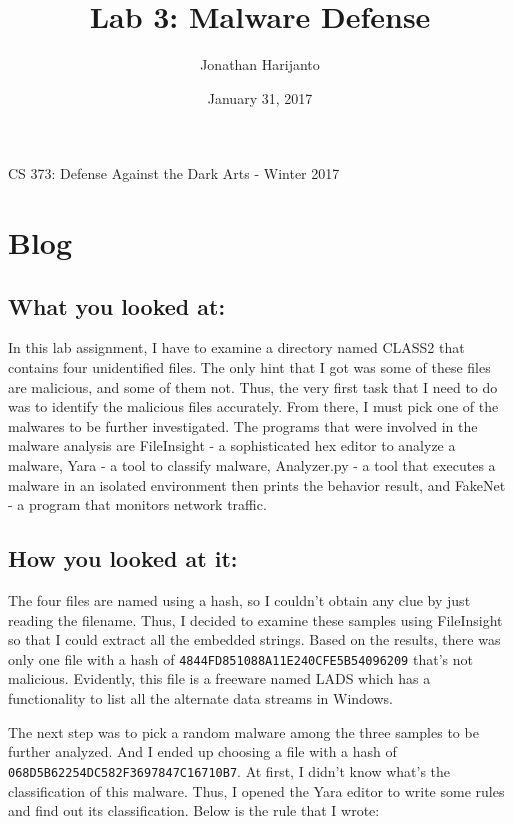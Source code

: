 \documentclass[letterpaper,10pt,titlepage,draftclsnofoot,onecolumn]{IEEEtran}
\title{Lab 3: Malware Defense}
\author{Jonathan Harijanto}
\date{January 31, 2017}
\begin{document}
\maketitle
\begin{center}
CS 373: Defense Against the Dark Arts - Winter 2017
\vfill
\end{center}
\begin{abstract}

\end{abstract}
\newpage

\section{Blog} 

\subsection{What you looked at:}
In this lab assignment, I have to examine a directory named CLASS2 that contains four unidentified files. 
The only hint that I got was some of these files are malicious, and some of them not.
Thus, the very first task that I need to do was to identify the malicious files accurately. 
From there, I must pick one of the malwares to be further investigated.
The programs that were involved in the malware analysis are FileInsight - a sophisticated hex editor to analyze a malware, Yara - a tool to classify malware, Analyzer.py - a tool that executes a malware in an isolated environment then prints the behavior result, and FakeNet - a program that monitors network traffic.

\subsection{How you looked at it:}
The four files are named using a hash, so I couldn't obtain any clue by just reading the filename.
Thus, I decided to examine these samples using FileInsight so that I could extract all the embedded strings.
Based on the results, there was only one file with a hash of \verb|4844FD851088A11E240CFE5B54096209| that's not malicious.
Evidently, this file is a freeware named LADS which has a functionality to list all the alternate data streams in Windows.

The next step was to pick a random malware among the three samples to be further analyzed. 
And I ended up choosing a file with a hash of \verb|068D5B62254DC582F3697847C16710B7|. 
At first, I didn't know what's the classification of this malware.
Thus, I opened the Yara editor to write some rules and find out its classification. 
Below is the rule that I wrote:
\end{document}
